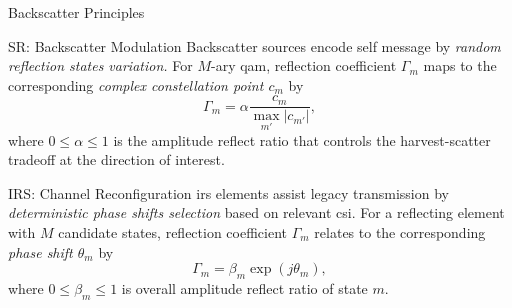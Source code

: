 \documentclass[journal]{IEEEtran}
\begin{document}
\begin{section}{Backscatter Principles}
	\begin{subsection}{SR: Backscatter Modulation}
		Backscatter sources encode self message by \emph{random reflection states variation.} For $M$-ary \gls{qam}, reflection coefficient $\Gamma_m$ maps to the corresponding \emph{complex constellation point $c_m$} by \cite{Thomas2012a}
		\begin{equation}
			\Gamma_m = \alpha \frac{c_m}{\max_{m'} \lvert c_{m'} \rvert},
			\label{eq:backscatter_modulation}
		\end{equation}
		where $0 \le \alpha \le 1$ is the amplitude reflect ratio that controls the harvest-scatter tradeoff at the direction of interest.

	\end{subsection}

	\begin{subsection}{IRS: Channel Reconfiguration}
		\gls{irs} elements assist legacy transmission by \emph{deterministic phase shifts selection} based on relevant \gls{csi}.
		For a reflecting element with $M$ candidate states, reflection coefficient $\Gamma_m$ relates to the corresponding \emph{phase shift $\theta_m$} by \cite{Wu2018}
		\begin{equation}
			\Gamma_m = \beta_m \exp(j \theta_m),
		\end{equation}
		where $0 \le \beta_m \le 1$ is overall amplitude reflect ratio of state $m$.
	\end{subsection}


\end{section}
\end{document}
